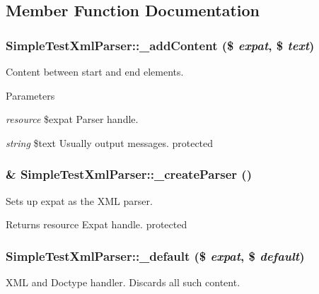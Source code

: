 \subsection{Member Function Documentation}
\hypertarget{class_simple_test_xml_parser_a574d2bd0039708a19f9f7f73d188c537}{
\subsubsection[{\_\-addContent}]{\setlength{\rightskip}{0pt plus 5cm}SimpleTestXmlParser::\_\-addContent (\$ {\em expat}, \/  \$ {\em text})}}
\label{class_simple_test_xml_parser_a574d2bd0039708a19f9f7f73d188c537}
Content between start and end elements. 
\begin{DoxyParams}{Parameters}
\item[{\em resource}]\$expat Parser handle. \item[{\em string}]\$text Usually output messages.  protected \end{DoxyParams}
\hypertarget{class_simple_test_xml_parser_a9a5607a7f11af705736a773612a7ec6d}{
\subsubsection[{\_\-createParser}]{\setlength{\rightskip}{0pt plus 5cm}\& SimpleTestXmlParser::\_\-createParser ()}}
\label{class_simple_test_xml_parser_a9a5607a7f11af705736a773612a7ec6d}
Sets up expat as the XML parser. \begin{DoxyReturn}{Returns}
resource Expat handle.  protected 
\end{DoxyReturn}
\hypertarget{class_simple_test_xml_parser_a3d549714cdcc6015cb519adb990d0033}{
\subsubsection[{\_\-default}]{\setlength{\rightskip}{0pt plus 5cm}SimpleTestXmlParser::\_\-default (\$ {\em expat}, \/  \$ {\em default})}}
\label{class_simple_test_xml_parser_a3d549714cdcc6015cb519adb990d0033}
XML and Doctype handler. Discards all such content. 
